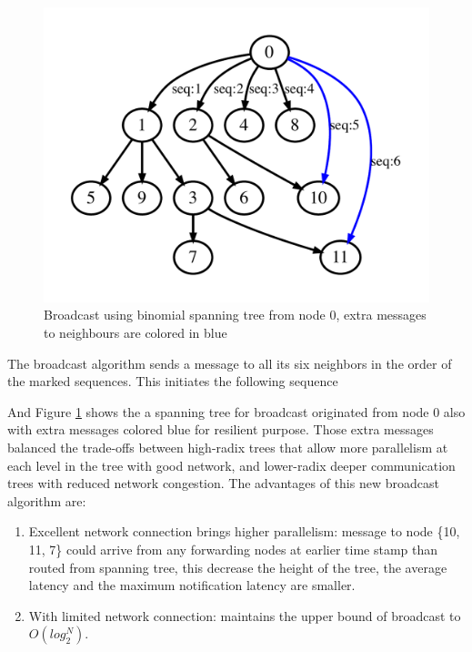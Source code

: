 \documentclass[sigconf]{acmart}
\begin{document}
\begin{figure}
  \centering
  \includegraphics[width=\linewidth]{reorder_span.pdf}
  \caption{Broadcast using binomial spanning tree from node 0, extra messages to neighbours are colored in blue }
  \label{fig:reorder_span}
\end{figure}




The broadcast algorithm sends a message to all its six neighbors in the order of the marked sequences. This initiates the following sequence 




And Figure \ref{fig:reorder_span} shows the a spanning tree for broadcast originated from node 0 also with extra messages colored blue for resilient purpose. Those extra messages balanced the trade-offs between high-radix trees that allow more parallelism at each level in the tree with good network, and lower-radix deeper communication trees with reduced network congestion. The advantages of this new broadcast algorithm are:
\begin{enumerate}
  \item Excellent network connection brings higher parallelism: message to node \{10, 11, 7\} could arrive from any forwarding nodes at earlier time stamp than routed from spanning tree, this decrease the height of the tree, the average latency and the maximum notification latency are smaller.
  \item With limited network connection: maintains the upper bound of broadcast to $O(log_2^{N})$. 
\end{enumerate}
\end{document}
